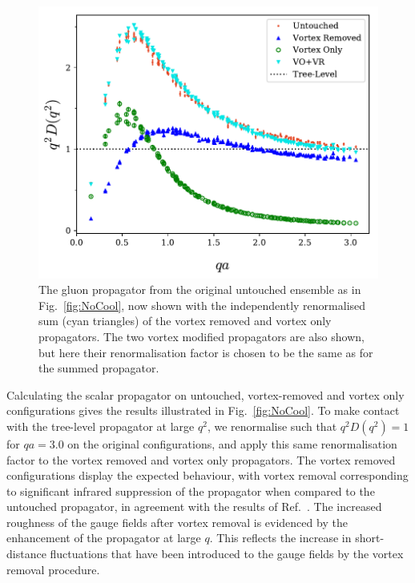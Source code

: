 %
\begin{figure}[tb]
\centering
\includegraphics[width=\linewidth]{./ScalarGluComp_q2_NoCoolSum2.pdf}
\caption{\label{fig:NoCoolSum}The gluon propagator from the original untouched ensemble as in Fig.~\ref{fig:NoCool}, now shown with the independently renormalised sum (cyan triangles) of the vortex removed and vortex only propagators. The two vortex modified propagators are also shown, but here their renormalisation factor is chosen to be the same as for the summed propagator.}
\end{figure}
%
Calculating the scalar propagator on untouched, vortex-removed and vortex only configurations gives the results illustrated in Fig.~\ref{fig:NoCool}. To make contact with the tree-level propagator at large $q^2$, we renormalise such that $q^2D(q^2)=1$ for $qa = 3.0$ on the original configurations, and apply this same renormalisation factor to the vortex removed and vortex only propagators. The vortex removed configurations display the expected behaviour, with vortex removal corresponding to significant infrared suppression of the propagator when compared to the untouched propagator, in agreement with the results of Ref.~\cite{Bowman:2010zr}. The increased roughness of the gauge fields after vortex removal is evidenced by the enhancement of the propagator at large $q$. This reflects the increase in short-distance fluctuations that have been introduced to the gauge fields by the vortex removal procedure.\\

